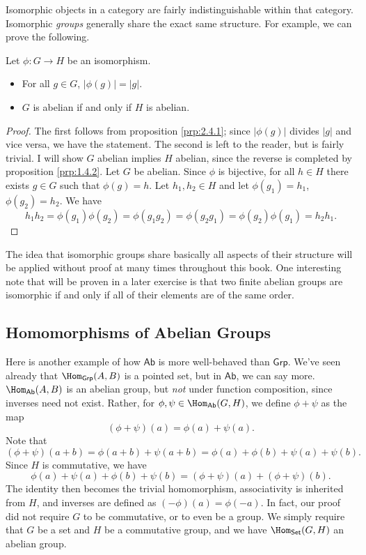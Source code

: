 Isomorphic objects in a category are fairly indistinguishable within that category. Isomorphic \emph{groups} generally share the exact same structure. For example, we can prove the following.
\begin{proposition}
	Let $\phi : G \to H$ be an isomorphism.
	\begin{itemize}
		\item For all $g\in G$, $\left| \phi (g) \right| =\left| g \right| $.
		\item $G$ is abelian if and only if $H$ is abelian.
	\end{itemize}
\end{proposition}
\begin{proof}
	The first follows from proposition \ref{prp:2.4.1}; since $\left| \phi (g) \right| $ divides $\left| g \right| $ and vice versa, we have the statement. The second is left to the reader, but is fairly trivial. I will show $G$ abelian implies $H$ abelian, since the reverse is completed by proposition \ref{prp:1.4.2}. Let $G$ be abelian. Since $\phi $ is bijective, for all $h\in H$ there exists $g\in G$ such that $\phi (g)=h$. Let $h_1,h_2\in H$ and let $\phi (g_1)=h_1$, $\phi (g_2)=h_2$. We have
	\[
		h_1h_2=\phi (g_1)\phi (g_2)=\phi (g_1g_2)=\phi (g_2g_1)=\phi (g_2)\phi (g_1)=h_2h_1
	.\]
\end{proof}

The idea that isomorphic groups share basically all aspects of their structure will be applied without proof at many times throughout this book. One interesting note that will be proven in a later exercise is that two finite abelian groups are isomorphic if and only if all of their elements are of the same order.

\subsection{Homomorphisms of Abelian Groups}
Here is another example of how $\mathsf{Ab}$ is more well-behaved than $\mathsf{Grp}$. We've seen already that $\Hom_{\mathsf{Grp}}(A , B) $ is a pointed set, but in  $\mathsf{Ab}$, we can say more. $\Hom_{\mathsf{Ab}}(A , B) $ is an abelian group, but \emph{not} under function composition, since inverses need not exist. Rather, for $\phi ,\psi \in \Hom_{\mathsf{Ab}}(G , H) $, we define $\phi +\psi $ as the map
\[
	(\phi +\psi )(a)=\phi (a)+\psi (a)
.\]
Note that
\[
	(\phi +\psi )(a+b)=\phi (a+b)+\psi (a+b)=\phi (a)+\phi (b)+\psi (a)+\psi (b)
.\]
Since $H$ is commutative, we have
\[
	\phi (a)+\psi (a)+\phi (b)+\psi (b)=(\phi +\psi )(a)+(\phi +\psi )(b)
.\]
The identity then becomes the trivial homomorphism, associativity is inherited from $H$, and inverses are defined as $(-\phi )(a)=\phi (-a)$. In fact, our proof did not require $G$ to be commutative, or to even be a group. We simply require that $G$ be a set and $H$ be a commutative group, and we have $\Hom_{\mathsf{Set}}(G , H) $ an abelian group. 


